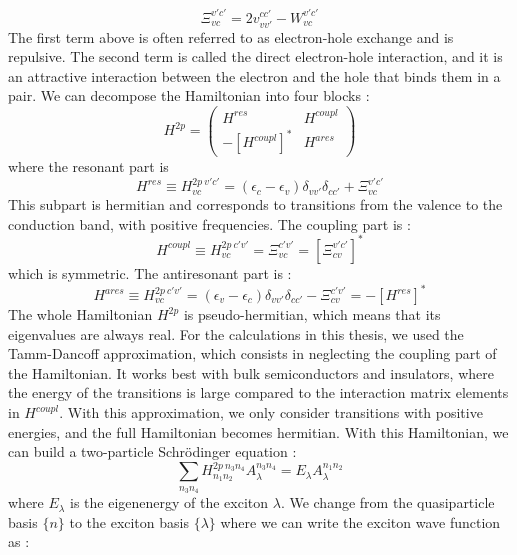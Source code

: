\begin{equation}
	\Xi^{v'c'}_{vc} = 2v^{cc'}_{vv'} - W^{v'c'}_{vc} \label{eq:BSE_kernel_vc}
\end{equation}
The first term above is often referred to as electron-hole exchange and is repulsive. The second term is called the direct electron-hole interaction, and it is an attractive interaction between the electron and the hole that binds them in a pair.
We can decompose the Hamiltonian into four blocks :
\begin{equation}
	H^{2p} = \begin{pmatrix}
		H^{res} & H^{coupl} \\
		-[H^{coupl}]^* & H^{ares}
	\end{pmatrix}
\end{equation}
where the resonant part is 
\begin{equation}
	H^{res} \equiv H^{2p\ v'c'}_{vc} = (\epsilon_c - \epsilon_v) \delta_{vv'}\delta_{cc'} + \Xi^{v'c'}_{vc} \label{eq:H_BSE_res}
\end{equation}
This subpart is hermitian and corresponds to transitions from the valence to the conduction band, with positive frequencies. The coupling part is :
\begin{equation}
	H^{coupl} \equiv H^{2p\ c'v'}_{vc} = \Xi^{c'v'}_{vc} = [\Xi^{v'c'}_{cv}]^*
\end{equation}
which is symmetric. The antiresonant part is :
\begin{equation}
	H^{ares} \equiv H^{2p\ c'v'}_{vc} = (\epsilon_v - \epsilon_c)\delta_{vv'}\delta_{cc'} - \Xi^{c'v'}_{cv} = - [H^{res}]^*
\end{equation}
The whole Hamiltonian $H^{2p}$ is pseudo-hermitian, which means that its eigenvalues are always real. For the calculations in this thesis, we used the Tamm-Dancoff approximation, which consists in neglecting the coupling part of the Hamiltonian. It works best with bulk semiconductors and insulators, where the energy of the transitions is large compared to the interaction matrix elements in $H^{coupl}$. \cite{gruning2009exciton} With this approximation, we only consider transitions with positive energies, and the full Hamiltonian becomes hermitian.
With this Hamiltonian, we can build a two-particle Schrödinger equation :
\begin{equation}
	\sum_{n_3n_4} H^{2p\ n_3n_4}_{n_1n_2} A_\lambda^{n_3n_4} = E_\lambda A_\lambda^{n_1n_2} \label{eq:BSE_secular}
\end{equation}
where $E_\lambda$ is the eigenenergy of the exciton $\lambda$. We change from the quasiparticle basis $\{n\}$ to the exciton basis $\{\lambda\}$ where we can write the exciton wave function as :
